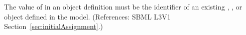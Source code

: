 The value of  in an \InitialAssignment object definition must
be the identifier of an existing \Compartment, \Species, \Parameter or
\SpeciesReference object defined in the model.  (References: SBML L3V1
Section~\ref{sec:initialAssignment}.)
